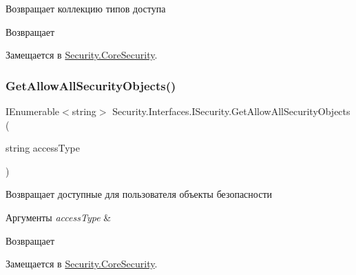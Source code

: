 Возвращает коллекцию типов доступа 

\begin{DoxyReturn}{Возвращает}

\end{DoxyReturn}


Замещается в \hyperlink{class_security_1_1_core_security_a874a60fc9733766b2530c295a7009aed}{Security.\+Core\+Security}.

\mbox{\label{interface_security_1_1_interfaces_1_1_i_security_aa7e5e1c0fdd2fe0e3a763750decbcffb}} 
\subsubsection{\texorpdfstring{Get\+Allow\+All\+Security\+Objects()}{GetAllowAllSecurityObjects()}}
{\footnotesize\ttfamily I\+Enumerable$<$string$>$ Security.\+Interfaces.\+I\+Security.\+Get\+Allow\+All\+Security\+Objects (\begin{DoxyParamCaption}\item[{string}]{access\+Type }\end{DoxyParamCaption})}



Возвращает доступные для пользователя объекты безопасности 


\begin{DoxyParams}{Аргументы}
{\em access\+Type} & \\
\hline
\end{DoxyParams}
\begin{DoxyReturn}{Возвращает}

\end{DoxyReturn}


Замещается в \hyperlink{class_security_1_1_core_security_acf070051371bf58f0f4b082e5f6b7352}{Security.\+Core\+Security}.

\mbox{\label{interface_security_1_1_interfaces_1_1_i_security_aef63980964e18a05521826c46040c068}} 
